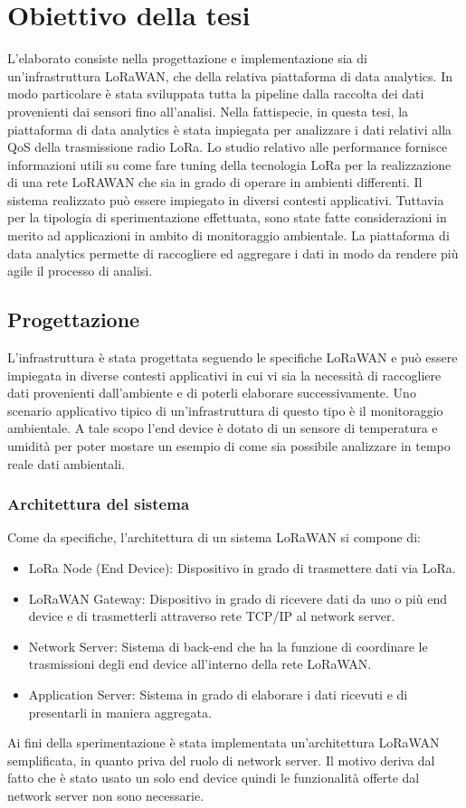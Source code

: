 \documentclass[12pt,a4paper,openright,twoside]{report}
\begin{document}
\part{Obiettivo della tesi}
L'elaborato consiste nella progettazione e implementazione sia di un'infrastruttura LoRaWAN, che della relativa piattaforma di data analytics. In modo particolare \`e stata sviluppata tutta la pipeline dalla raccolta dei dati provenienti dai sensori fino all'analisi. 
Nella fattispecie, in questa tesi, la piattaforma di data analytics \`e stata impiegata per analizzare i dati relativi alla QoS della trasmissione radio LoRa.
Lo studio relativo alle performance fornisce informazioni utili su come fare tuning della tecnologia LoRa per la realizzazione di una rete LoRAWAN che sia in grado di operare in ambienti differenti.
Il sistema realizzato pu\`o essere impiegato in diversi contesti applicativi. Tuttavia per la tipologia di sperimentazione effettuata, sono state fatte considerazioni in merito ad applicazioni in ambito di monitoraggio ambientale.
La piattaforma di data analytics permette di raccogliere ed aggregare i dati in modo da rendere pi\`u agile il processo di analisi. 

\chapter{Progettazione}
L'infrastruttura \`e stata progettata seguendo le specifiche LoRaWAN e pu\`o essere impiegata in diverse contesti applicativi in cui vi sia la necessit\`a di raccogliere dati provenienti dall'ambiente e di poterli elaborare successivamente. Uno scenario applicativo tipico di un'infrastruttura di questo tipo \`e il monitoraggio ambientale. A tale scopo l'end device \`e dotato di un sensore di temperatura e umidit\`a per poter mostare un esempio di come sia possibile analizzare in tempo reale dati ambientali.   

\section{Architettura del sistema}
Come da specifiche, l'architettura di un sistema LoRaWAN si compone di: 
\begin{itemize}                       
\item LoRa Node (End Device): Dispositivo in grado di trasmettere dati via LoRa.
\item LoRaWAN Gateway: Dispositivo in grado di ricevere dati da uno o pi\`u end device e di trasmetterli attraverso rete TCP/IP al network server.
\item Network Server: Sistema di back-end che ha la funzione di coordinare le trasmissioni degli end device all'interno della rete LoRaWAN.
\item Application Server: Sistema in grado di elaborare i dati ricevuti e di presentarli in maniera aggregata.
\end{itemize}
Ai fini della sperimentazione \`e stata implementata un'architettura LoRaWAN semplificata, in quanto priva del ruolo di network server. Il motivo deriva dal fatto che \`e stato usato un solo end device quindi le funzionalit\`a offerte dal network server non sono necessarie.  
\end{document}
